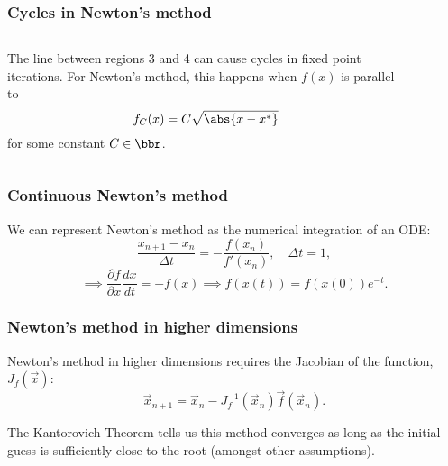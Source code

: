 \documentclass{beamer}
\begin{document}
\begin{frame}
\frametitle{Cycles in Newton's method}

\begin{columns}
\begin{column}{0.5\textwidth}
The line between regions 3 and 4 can cause cycles in fixed point iterations.
For Newton's method, this happens when $f(x)$ is parallel to
\begin{equation*}
	f_C(x) = C \sqrt{ \abs{x - x^*} }
\end{equation*}
for some constant $C \in \bbr$.
\end{column}
\begin{column}{0.5\textwidth}
            \begin{figure}
                \centering
                \label{fig:NR2}
            \end{figure}
\end{column}
\end{columns}

\end{frame}

\begin{frame}
\frametitle{Continuous Newton's method}

We can represent Newton's method as the numerical integration of an ODE:
\begin{equation*}
	\frac{x_{n+1} - x_n}{\Delta t} = -\frac{f(x_n)}{f'(x_n)}, \quad \Delta t = 1,
\end{equation*}
\begin{equation*}
	\implies \frac{\partial f}{\partial x} \frac{d x}{dt} = -f(x) \implies f(x(t)) = f(x(0)) e^{-t}.
\end{equation*}

\end{frame}

\begin{frame}
\frametitle{Newton's method in higher dimensions}

Newton's method in higher dimensions requires the Jacobian of the function, $J_f(\vec{x})$:
\begin{equation*}
	\vec{x}_{n+1} = \vec{x}_n - J_f^{-1}(\vec{x}_n) \vec{f}(\vec{x}_n).
\end{equation*}

The Kantorovich Theorem tells us this method converges as long as the initial guess is sufficiently close to the root (amongst other assumptions).

\end{frame}
\end{document}
